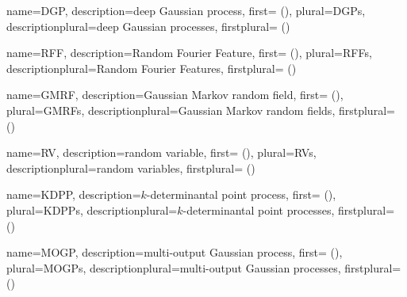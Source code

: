 {
  name={DGP},
  description={deep Gaussian process},
  first={ ()},
  plural={DGPs},
  descriptionplural={deep Gaussian processes},
  firstplural={ ()}
} 


{
  name={RFF},
  description={Random Fourier Feature},
  first={ ()},
  plural={RFFs},
  descriptionplural={Random Fourier Features},
  firstplural={ ()}
} 

{
  name={GMRF},
  description={Gaussian Markov random field},
  first={ ()},
  plural={GMRFs},
  descriptionplural={Gaussian Markov random fields},
  firstplural={ ()}
} 

{
  name={RV},
  description={random variable},
  first={ ()},
  plural={RVs},
  descriptionplural={random variables},
  firstplural={ ()}
} 
 

{
  name={KDPP},
  description={$k$-determinantal point process},
  first={ ()},
  plural={KDPPs},
  descriptionplural={$k$-determinantal point processes},
  firstplural={ ()}
} 

{
  name={MOGP},
  description={multi-output Gaussian process},
  first={ ()},
  plural={MOGPs},
  descriptionplural={multi-output Gaussian processes},
  firstplural={ ()}
} 


